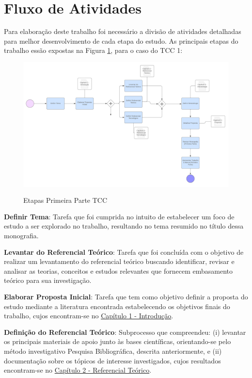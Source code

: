 
\section {Fluxo de Atividades}
\label{Fluxo}

Para elaboração deste trabalho foi necessário a divisão de atividades detalhadas para melhor desenvolvimento de cada etapa do estudo. As principais etapas do trabalho essão expostas na Figura \ref{fig06}, para o caso do TCC 1:

\begin{figure}[ht]
    \centering
    \caption{Etapas Primeira Parte TCC}
    \includegraphics[keepaspectratio=true,scale=0.2]{figuras/cap04Fluxograma1.png}
    \label{fig06}
\end{figure}

\textbf{Definir Tema}: Tarefa que foi cumprida no intuito de estabelecer um foco de estudo a ser explorado no trabalho, resultando no tema resumido no título dessa monografia.

\textbf{Levantar do Referencial Teórico}: Tarefa que foi concluída com o objetivo de realizar um levantamento do referencial teórico buscando identificar, revisar e analisar as teorias, conceitos e estudos relevantes que fornecem embasamento teórico para sua investigação.

\textbf{Elaborar Proposta Inicial}: Tarefa que tem como objetivo definir a proposta do estudo mediante a literatura encontrada estabelecendo os objetivos finais do trabalho, cujos encontram-se no \hyperref[chap:Introducao]{Capítulo 1 - Introdução}.

\textbf{Definição do Referencial Teórico}: Subprocesso que compreendeu: (i) levantar os principais materiais de apoio junto às bases científicas, orientando-se pelo método investigativo Pesquisa Bibliográfica, descrita anteriormente, e (ii) documentação sobre os tópicos de interesse investigados, cujos resultados encontram-se no \hyperref[chap:ReferencialTeorico]{Capítulo 2 - Referencial Teórico}.

